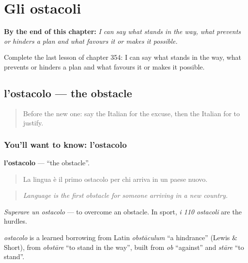 
\chapter{Gli ostacoli}
\label{ch:it-gli-ostacoli}

\begin{chapteropening}
\textbf{By the end of this chapter:} \emph{I can say what stands in the way, what prevents or hinders a plan and what favours it or makes it possible.}

Complete the last lesson of chapter 354: I can say what stands in the way, what prevents or hinders a plan and what favours it or makes it possible.
\end{chapteropening}

\section[l'ostacolo]{l'ostacolo — the obstacle}

\label{lesson:IT-C354-ostacolo}



\begin{quote}
Before the new one: say the Italian for the excuse, then the Italian for to justify.
\end{quote}

\subsection*{You'll want to know: l'ostacolo}
\textbf{l'ostacolo} — \textquotedblleft{}the obstacle\textquotedblright{}.

\begin{quote}
La lingua è il primo ostacolo per chi arriva in un paese nuovo.
\end{quote}

\begin{quote}
\emph{Language is the first obstacle for someone arriving in a new country.}
\end{quote}

\emph{Superare un ostacolo} — to overcome an obstacle. In sport, \emph{i 110 ostacoli} are the hurdles.

\begin{cousinweb}
\emph{ostacolo} is a learned borrowing from Latin \emph{obstāculum} \textquotedblleft{}a hindrance\textquotedblright{} (Lewis \& Short), from \emph{obstāre} \textquotedblleft{}to stand in the way\textquotedblright{}, built from \emph{ob} \textquotedblleft{}against\textquotedblright{} and \emph{stāre} \textquotedblleft{}to stand\textquotedblright{}.
\end{cousinweb}

